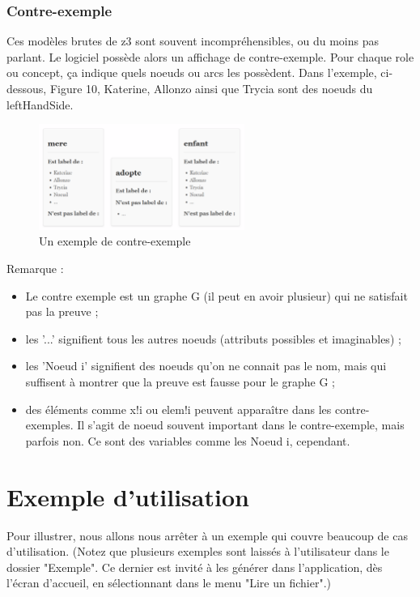 \documentclass[11pt,a4paper]{article}
\begin{document}
\subsubsection{Contre-exemple}
Ces modèles brutes de z3 sont souvent incompréhensibles, ou du moins pas parlant. Le logiciel possède alors un affichage de contre-exemple. Pour chaque role ou concept, ça indique quels noeuds ou arcs les possèdent. Dans l'exemple, ci-dessous, Figure 10, Katerine, Allonzo ainsi que Trycia sont des noeuds du leftHandSide.

\begin{figure}[htbp]
  \centering
  \includegraphics[width=0.6\textwidth]{screen113.png}
  \caption{Un exemple de contre-exemple}
  \label{fig:mon_image}
\end{figure}

Remarque :
\begin{itemize}
\item Le contre exemple est un graphe G (il peut en avoir plusieur) qui ne satisfait pas la preuve ;
\item les '...' signifient tous les autres noeuds (attributs possibles et imaginables) ;
\item les 'Noeud i' signifient des noeuds qu'on ne connait pas le nom, mais qui suffisent à montrer que la preuve est fausse pour le graphe G  ;
\item des éléments comme x!i ou elem!i peuvent apparaître dans les contre-exemples. Il s'agit de noeud souvent important dans le contre-exemple, mais parfois non. Ce sont des variables comme les Noeud i, cependant. 
\end{itemize}


\newpage
\section{Exemple d'utilisation}
Pour illustrer, nous allons nous arrêter à un exemple qui couvre beaucoup de cas d'utilisation. (Notez que plusieurs exemples sont laissés à l'utilisateur dans le dossier "Exemple". Ce dernier est invité à les générer dans l'application, dès l'écran d'accueil, en sélectionnant dans le menu "Lire un fichier".) \\
\end{document}
